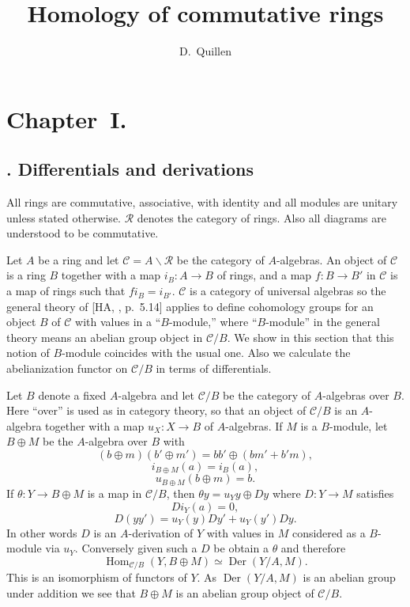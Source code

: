 \documentclass[10pt,reqno]{amsart}
\title{Homology of commutative rings}
\author{D.~Quillen}
\DeclareMathOperator{\Hom}{Hom}
\DeclareMathOperator{\Der}{Der}
\newcommand{\cat}{\mathcal}
\newcommand{\C}{\cat{C}}
\newcommand{\R}{\cat{R}}
\begin{document}
\maketitle

\section*{Chapter~I.}
\subsection*{. Differentials and derivations}

All rings are commutative, associative, with identity and all modules are unitary unless
stated otherwise. $\R$ denotes the category of rings. Also all diagrams are understood
to be commutative.

Let $A$ be a ring and let $\C=A\backslash\R$ be the category of $A$-algebras.
An object of $\C$ is a ring $B$ together with a map $i_B:A\to B$ of rings,
and a map $f:B\to B'$ in $\C$ is a map of rings such that $fi_B=i_{B'}$. $\C$
is a category of universal algebras so the general theory of [HA, , p.~5.14]
applies to define cohomology groups for an object $B$
of $\C$ with values in a ``$B$-module,'' where ``$B$-module'' in the general theory
means an abelian group object in $\C/B$. We show in this section that this notion of
$B$-module coincides with the usual one. Also we calculate the abelianization functor
on $\C/B$ in terms of differentials.

Let $B$ denote a fixed $A$-algebra and let $\C/B$ be the category of $A$-algebras
over $B$. Here ``over'' is used as in category theory, so that an object of $\C/B$
is an $A$-algebra together with a map $u_X:X\to B$ of $A$-algebras. If $M$ is a
$B$-module, let $B\oplus M$ be the $A$-algebra over $B$ with
\[
  (b\oplus m)(b'\oplus m')=bb'\oplus(bm'+b'm),
\]
\[
  i_{B\oplus M}(a)=i_B(a),
\]
\[
  u_{B\oplus M}(b\oplus m)=b.
\]
If $\theta:Y\to B\oplus M$ is a map in $\C/B$, then $\theta y=u_Y y\oplus Dy$ where
$D:Y\to M$ satisfies
\[
  Di_Y(a)=0,
\]
\[
  D(yy')=u_Y(y)Dy'+u_Y(y')Dy.
\]
In other words $D$ is an $A$-derivation of $Y$ with values in $M$ considered as a
$B$-module via $u_Y$. Conversely given such a $D$ be obtain a $\theta$ and therefore
\[
  \Hom_{\C/B}(Y,B\oplus M)\simeq\Der(Y/A,M).\tag{1.1}
\]
This is an isomorphism of functors of $Y$. As $\Der(Y/A,M)$ is an abelian group under
addition we see that $B\oplus M$ is an abelian group object of $\C/B$.
\end{document}
